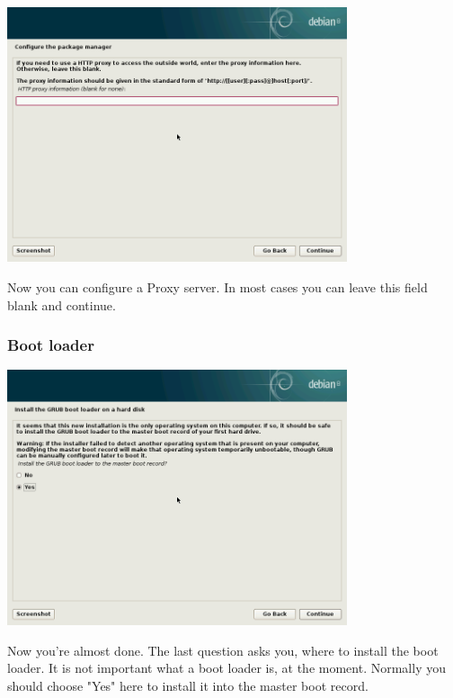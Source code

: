 \documentclass[a4paper,12pt,twoside]{article}
\begin{document}
\begin{minipage}{\linewidth}
    \centering
    \captionsetup{type=figure}
    \includegraphics[width=10cm]{screenshots/set_mirror_proxy.png}
    \label{fig:select_proxy}
\end{minipage}
\bigskip

Now you can configure a Proxy server. In most cases you can leave this
field blank and continue.


\subsubsection{Boot loader}
\label{sct:boot_loader}

\begin{minipage}{\linewidth}
    \centering
    \captionsetup{type=figure}
    \includegraphics[width=10cm]{screenshots/select_bootloader_mbr.png}
    \label{fig:inst_grub}
\end{minipage}
\bigskip

Now you're almost done. The last question asks you,
where to install the boot loader. It is not important what a boot
loader is, at the moment. Normally you should choose
"Yes" here to install it into the master
boot record.
\end{document}
